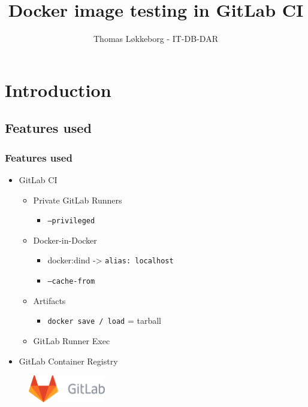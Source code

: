 \documentclass[14pt,aspectratio=169]{beamer}
\title[]{Docker image testing in GitLab CI}
\author[Author]{Thomas Løkkeborg - IT-DB-DAR}
\begin{document}
\cernSplashBlue

{
  \frame{\titlepage}
}
\setcounter{framenumber}{0}



\section{Introduction}

\subsection{Features used}

\begin{frame}
  \frametitle{Features used}
    \begin{itemize}
      \item GitLab CI
      \begin{itemize}
        \item Private GitLab Runners
        \begin{itemize}
          \item \texttt{--privileged}
        \end{itemize}
        \item Docker-in-Docker
        \begin{itemize}
          \item docker:dind -> \texttt{alias: localhost}
          \item \texttt{--cache-from}
        \end{itemize}
        \item Artifacts
        \begin{itemize}
          \item \texttt{docker save / load} = tarball
        \end{itemize}
        \item GitLab Runner Exec
      \end{itemize}
      \item GitLab Container Registry
    \end{itemize}
  \begin{figure}
    \includegraphics[width=0.3\textwidth]{images/gitlab.png}
  \end{figure}
\end{frame}
\end{document}
